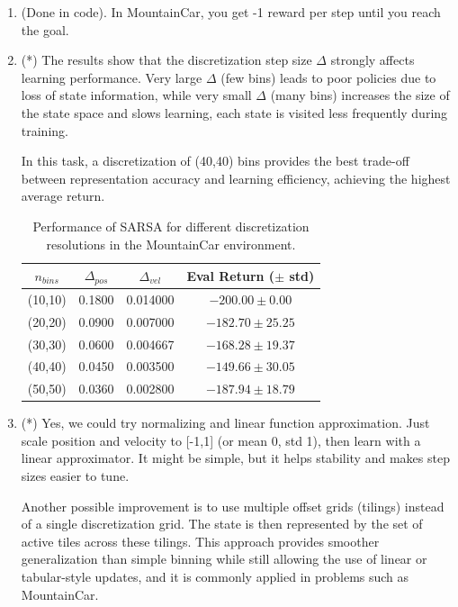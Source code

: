 \documentclass{article}
\begin{document}
\begin{enumerate}
    \item (Done in code). In MountainCar, you get -1 reward per step until you reach the goal.

    \item (*) The results show that the discretization step size $\Delta$ strongly affects learning performance. Very large $\Delta$ (few bins) leads to poor policies due to loss of state information, while very small $\Delta$ (many bins) increases the size of the state space and slows learning, each state is visited less frequently during training.
    
    In this task, a discretization of (40,40) bins provides the best trade-off between representation accuracy and learning efficiency, achieving the highest average return.
    \begin{table}[h]
        \centering
        \large
        \begin{tabular}{c c c c}
        \hline
        $n_{bins}$ & $\Delta_{pos}$ & $\Delta_{vel}$ & Eval Return ($\pm$ std) \\
        \hline
        (10,10) & 0.1800 & 0.014000 & $-200.00 \pm 0.00$ \\
        (20,20) & 0.0900 & 0.007000 & $-182.70 \pm 25.25$ \\
        (30,30) & 0.0600 & 0.004667 & $-168.28 \pm 19.37$ \\
        (40,40) & 0.0450 & 0.003500 & $-149.66 \pm 30.05$ \\
        (50,50) & 0.0360 & 0.002800 & $-187.94 \pm 18.79$ \\
        \hline
        \end{tabular}
        \caption{Performance of SARSA for different discretization resolutions in the MountainCar environment.}
        \label{tab:discretization_results}
    \end{table}

    \item (*) Yes, we could try normalizing and linear function approximation. Just scale position and velocity to [-1,1] (or mean 0, std 1), then learn with a linear approximator. It might be simple, but it helps stability and makes step sizes easier to tune.
    
    Another possible improvement is to use multiple offset grids (tilings) instead of a single discretization grid. The state is then represented by the set of active tiles across these tilings. This approach provides smoother generalization than simple binning while still allowing the use of linear or tabular-style updates, and it is commonly applied in problems such as MountainCar.
    
\end{enumerate}
\end{document}
